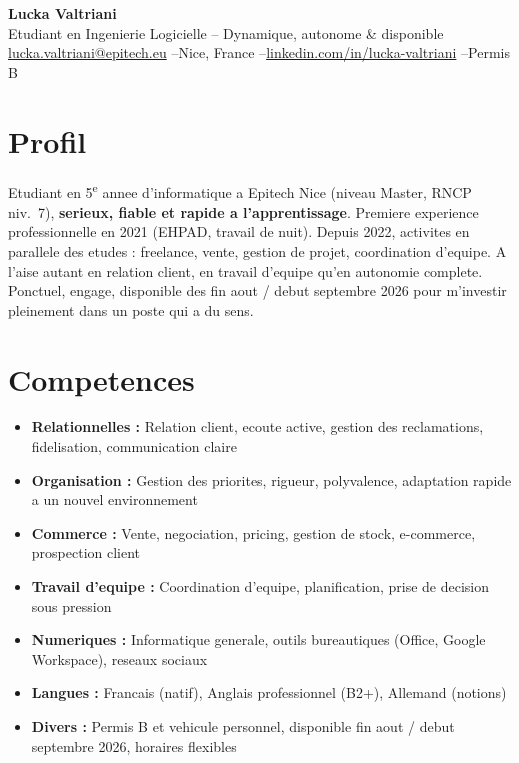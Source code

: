 \documentclass[9pt,a4paper]{article}
\newcommand{\myphone}{}
\begin{document}
\begin{center}
  {\Large\bfseries\color{accent} Lucka Valtriani}\\[3pt]
  {\small\color{gray} Etudiant en Ingenierie Logicielle -- Dynamique, autonome \& disponible}\\[4pt]
  {\footnotesize
    \myphone\href{mailto:lucka.valtriani@epitech.eu}{lucka.valtriani@epitech.eu}
    \quad--\quad Nice, France
    \quad--\quad \href{https://www.linkedin.com/in/lucka-valtriani-8a8551258/}{linkedin.com/in/lucka-valtriani}
    \quad--\quad Permis B
  }
\end{center}

\vspace{3pt}

\section{Profil}
{\small Etudiant en 5\textsuperscript{e} annee d'informatique a Epitech Nice (niveau Master, RNCP niv.~7), \textbf{serieux, fiable et rapide a l'apprentissage}. Premiere experience professionnelle en 2021 (EHPAD, travail de nuit). Depuis 2022, activites en parallele des etudes : freelance, vente, gestion de projet, coordination d'equipe. A l'aise autant en relation client, en travail d'equipe qu'en autonomie complete. Ponctuel, engage, disponible des fin aout / debut septembre 2026 pour m'investir pleinement dans un poste qui a du sens.}

\vspace{2pt}

\section{Competences}

{\small
\begin{itemize}
  \item \textbf{Relationnelles :} Relation client, ecoute active, gestion des reclamations, fidelisation, communication claire
  \item \textbf{Organisation :} Gestion des priorites, rigueur, polyvalence, adaptation rapide a un nouvel environnement
  \item \textbf{Commerce :} Vente, negociation, pricing, gestion de stock, e-commerce, prospection client
  \item \textbf{Travail d'equipe :} Coordination d'equipe, planification, prise de decision sous pression
  \item \textbf{Numeriques :} Informatique generale, outils bureautiques (Office, Google Workspace), reseaux sociaux
  \item \textbf{Langues :} Francais (natif), Anglais professionnel (B2+), Allemand (notions)
  \item \textbf{Divers :} Permis B et vehicule personnel, disponible fin aout / debut septembre 2026, horaires flexibles
\end{itemize}
}
\end{document}
